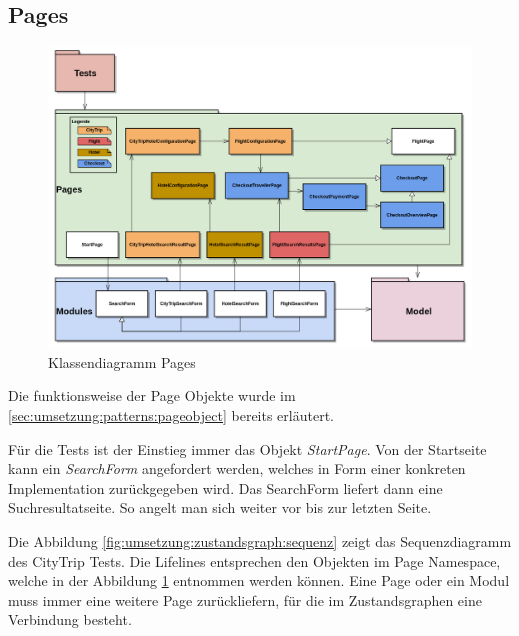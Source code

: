 \subsection{Pages}
\begin{figure}[H]
	\centering
	\includegraphics[width=1.0\textwidth]{images/semesterarbeit class diagram - pages.png}
	\caption{Klassendiagramm Pages}
	\label{fig:umsetzung:architektur:pages}
\end{figure}
Die funktionsweise der Page Objekte wurde im \cref{sec:umsetzung:patterns:pageobject}  bereits erläutert.

Für die Tests ist der Einstieg immer das Objekt \textit{StartPage}. Von der Startseite kann ein \textit{SearchForm} angefordert werden, welches in Form einer konkreten Implementation zurückgegeben wird. Das SearchForm liefert dann eine Suchresultatseite. So angelt man sich weiter vor bis zur letzten Seite.


Die Abbildung \ref{fig:umsetzung:zustandsgraph:sequenz} zeigt das Sequenzdiagramm des CityTrip Tests. Die Lifelines entsprechen den Objekten im Page Namespace, welche in der Abbildung \ref{fig:umsetzung:architektur:pages} entnommen werden können. Eine Page oder ein Modul muss immer eine weitere Page zurückliefern, für die im Zustandsgraphen eine Verbindung besteht.

